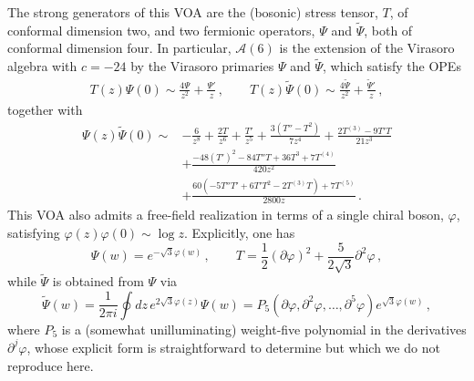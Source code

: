 \documentclass[12pt]{article}
\numberwithin{equation}{section}
\numberwithin{figure}{section}
\theoremstyle{plain}
\theoremstyle{definition}
\begin{document}
The strong generators of this VOA are the (bosonic) stress tensor, $T$, of conformal dimension two, and two fermionic operators, $\Psi$ and $\widetilde{\Psi}$, both of conformal dimension four. In particular, $\mathcal{A}(6)$ is the extension of the Virasoro algebra with $c = -24$ by the Virasoro primaries $\Psi$ and $\widetilde{\Psi}$, which satisfy the OPEs \cite{Feigin:2007sp,Jiang:2024baj}
\begin{equation}
\label{eqn:A6TOPE}
\begin{gathered}
T(z)\Psi(0) \sim \frac{4\Psi}{z^2} + \frac{\Psi'}{z} \,, \qquad T(z) \widetilde{\Psi}(0) \sim \frac{4\widetilde{\Psi}}{z^2} + \frac{\widetilde{\Psi}'}{z} \,,
\end{gathered}
\end{equation}
together with
\begin{equation}\label{eqn:A6PsiPsitOPE}
\begin{aligned}
\Psi(z)\widetilde{\Psi}(0) \sim{} & -\frac{6}{z^8} + \frac{2T}{z^6} + \frac{T'}{z^5} + \frac{3\left(T'' - T^2\right)}{7z^4} + \frac{2T^{(3)} - 9T'T}{21z^3} \\
& + \frac{-48\left(T'\right)^2 - 84 T''T + 36T^3 + 7T^{(4)}}{420z^2} \\ & + \frac{60\left(-5T''T' + 6T'T^2 - 2T^{(3)}T\right) + 7T^{(5)}}{2800z} \,.
\end{aligned}
\end{equation}
This VOA also admits a free-field realization in terms of a single chiral boson, $\varphi$, satisfying $\varphi(z)\varphi(0) \sim \log z$. Explicitly, one has \cite{Feigin:2007sp,Jiang:2024baj}
\begin{equation}\label{eqn:A6freefield}
    \Psi(w) = e^{-\sqrt{3}\varphi(w)} \,, \qquad T = \frac{1}{2}\left(\partial \varphi\right)^2 + \frac{5}{2\sqrt{3}} \partial^2 \varphi \,,
\end{equation}
while $\widetilde{\Psi}$ is obtained from $\Psi$ via
\begin{equation}\label{eqn:A6freefield2}
    \widetilde{\Psi}(w) = \frac{1}{2\pi i} \oint dz \, e^{2\sqrt{3}\varphi(z)} \Psi(w) = P_5\left(\partial\varphi, \partial^2 \varphi, \dots, \partial^5\varphi\right) e^{\sqrt{3}\varphi(w)} \,,
\end{equation}
where $P_5$ is a (somewhat unilluminating) weight-five polynomial in the derivatives $\partial^j \varphi$, whose explicit form is straightforward to determine but which we do not reproduce here.
\end{document}
